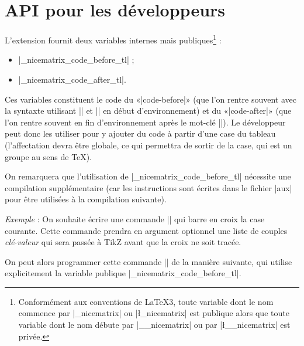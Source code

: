 \documentclass[dvipsnames]{article}%
\begin{document}


\section{API pour les développeurs}


L'extension  fournit deux variables internes mais publiques\footnote{Conformément aux conventions de LaTeX3,
  toute variable dont le nom commence par |\g_nicematrix| ou |\l_nicematrix| est
  publique alors que toute variable dont le nom débute par |\g__nicematrix| ou
  par |\l__nicematrix| est privée.} :
\begin{itemize}
\item |\g_nicematrix_code_before_tl| ;
\item |\g_nicematrix_code_after_tl|.
\end{itemize}

\medskip
Ces variables constituent le code du «|code-before|» (que l'on rentre souvent
avec la syntaxte utilisant |\CodeBefore| et |\Body| en début d'environnement) et
du «|code-after|» (que l'on rentre souvent en fin d'environnement après le
mot-clé |\CodeAfter|). Le développeur peut donc les utiliser pour y ajouter du
code à partir d'une case du tableau (l'affectation devra être globale, ce qui
permettra de sortir de la case, qui est un groupe au sens de TeX).

\medskip
On remarquera que l'utilisation de |\g_nicematrix_code_before_tl| nécessite une
compilation supplémentaire (car les instructions sont écrites dans le fichier
|aux| pour être utilisées à la compilation suivante).

\medskip
\emph{Exemple} : On souhaite écrire une commande |\crossbox| qui barre en croix
la case courante. Cette commande prendra en argument optionnel une liste de
couples \textsl{clé}-\textsl{valeur} qui sera passée à TikZ avant que la croix
ne soit tracée.


On peut alors programmer cette commande |\crossbox| de la manière suivante, qui
utilise explicitement la variable publique |\g_nicematrix_code_before_tl|.





%
\end{document}
